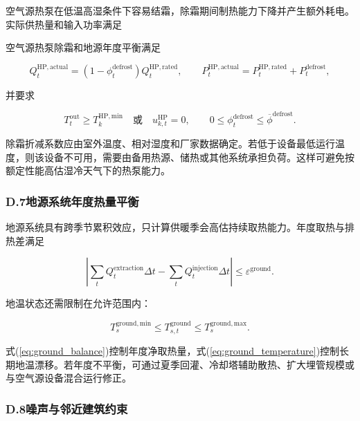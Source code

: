 空气源热泵在低温高湿条件下容易结霜，除霜期间制热能力下降并产生额外耗电。实际供热量和输入功率满足

空气源热泵除霜和地源年度平衡满足

\begin{equation}
Q_t^{\mathrm{HP,actual}}=(1-\phi_t^{\mathrm{defrost}})Q_t^{\mathrm{HP,rated}},
\qquad
P_t^{\mathrm{HP,actual}}=P_t^{\mathrm{HP,rated}}+P_t^{\mathrm{defrost}},
\label{eq:defrost}
\end{equation}

并要求

\begin{equation}
T_t^{\mathrm{out}}\geq T_k^{\mathrm{HP,min}}
\quad\text{或}\quad u_{k,t}^{\mathrm{HP}}=0,
\qquad
0\leq\phi_t^{\mathrm{defrost}}\leq\overline\phi^{\mathrm{defrost}}.
\label{eq:wuhan_hp_low_temperature}
\end{equation}

除霜折减系数应由室外温度、相对湿度和厂家数据确定。若低于设备最低运行温度，则该设备不可用，需要由备用热源、储热或其他系统承担负荷。这样可避免按额定性能高估湿冷天气下的热泵能力。

\subsubsection*{D.7\quad 地源系统年度热量平衡}

地源系统具有跨季节累积效应，只计算供暖季会高估持续取热能力。年度取热与排热差满足

\begin{equation}
\left|
\sum_tQ_t^{\mathrm{extraction}}\Delta t
-\sum_tQ_t^{\mathrm{injection}}\Delta t
\right|
\leq\varepsilon^{\mathrm{ground}}.
\label{eq:ground_balance}
\end{equation}

地温状态还需限制在允许范围内：

\begin{equation}
T_s^{\mathrm{ground,min}}\leq T_{s,t}^{\mathrm{ground}}\leq T_s^{\mathrm{ground,max}}.
\label{eq:ground_temperature}
\end{equation}

式(\ref{eq:ground_balance})控制年度净取热量，式(\ref{eq:ground_temperature})控制长期地温漂移。若年度不平衡，可通过夏季回灌、冷却塔辅助散热、扩大埋管规模或与空气源设备混合运行修正。

\subsubsection*{D.8\quad 噪声与邻近建筑约束}


